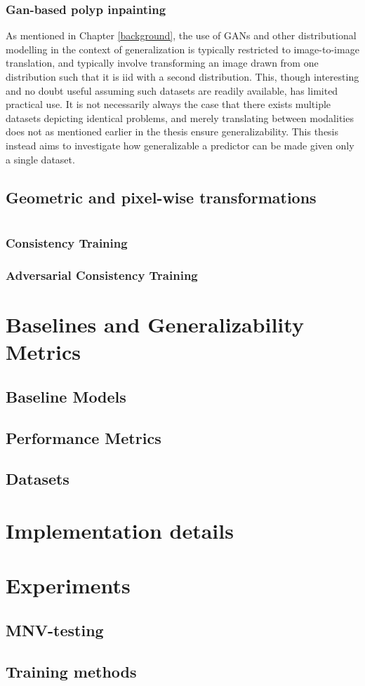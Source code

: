 \subsubsection{Gan-based polyp inpainting}
As mentioned in Chapter \ref{background}, the use of GANs and other distributional modelling in the context of generalization is typically restricted to image-to-image translation, and typically involve transforming an image drawn from one distribution such that it is iid with a second distribution. This, though interesting and no doubt useful assuming such datasets are readily available, has limited practical use. It is not necessarily always the case that there exists multiple datasets depicting identical problems, and merely translating between modalities does not as mentioned earlier in the thesis ensure generalizability. This thesis instead aims to investigate how generalizable a predictor can be made given only a single dataset. %
\subsection{Geometric and pixel-wise transformations}
\section{\alg}
    \subsubsection{Consistency Training}
    \subsubsection{Adversarial Consistency Training}
    \subsubsection{}
\section{Baselines and Generalizability Metrics}
    \subsection{Baseline Models}
    \subsection{Performance Metrics}
    \subsection{Datasets}
\section{Implementation details}
\section{Experiments}
    \subsection{MNV-testing}
    \subsection{Training methods}
    